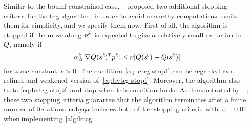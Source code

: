 Similar to the bound-constrained case, ~\cite[\S~2]{Powell_2015} proposed two additional stopping criteria for the \gls{tcg} algorithm, in order to avoid unworthy computations.
 omits them for simplicity, and we specify them now.
First of all, the algorithm is stopped if the move along~$\pstep[k]$ is expected to give a relatively small reduction in~$Q$, namely if
\begin{equation}
    \label{eq:lctcg-stop1}
    \alpha_{\rad}^k \abs[\big]{\nabla Q(\sstep[k])^{\T} \pstep[k]} \le \nu [Q(\sstep[0]) - Q(\sstep[k])]
\end{equation}
for some constant~$\nu > 0$.
The condition~\cref{eq:lctcg-stop1} can be regarded as a refined and weakened version of~\cref{eq:bvtcg-stop1}.
Moreover, the algorithm also tests~\cref{eq:bvtcg-stop2} and stop when this condition holds.
As demonstrated by~\citeauthor{Powell_2015}~\cite[\S~5]{Powell_2015}, these two stopping criteria guarantee that the algorithm terminates after a finite number of iterations.
\Gls{cobyqa} includes both of the stopping criteria with~$\nu = 0.01$ when implementing~\cref{alg:lctcg}.





